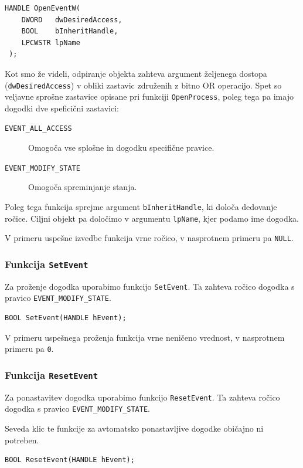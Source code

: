 \documentclass[a4paper,12pt,openright]{book}
\begin{document}
\begin{lstlisting}[style=func]
 HANDLE OpenEventW(
	DWORD   dwDesiredAccess,
	BOOL    bInheritHandle,
	LPCWSTR lpName
 );
\end{lstlisting}

Kot smo že videli, odpiranje objekta zahteva argument željenega dostopa (\texttt{dwDesiredAccess}) v obliki zastavic združenih z bitno OR operacijo.
Spet so veljavne sprošne zastavice opisane pri funkciji \texttt{OpenProcess}, poleg tega pa imajo dogodki dve speficični zastavici:
\begin{description}
	\item[\texttt{EVENT\_ALL\_ACCESS}] Omogoča vse splošne in dogodku specifične pravice.
	\item[\texttt{EVENT\_MODIFY\_STATE}] Omogoča spreminjanje stanja.
\end{description}

Poleg tega funkcija sprejme argument \texttt{bInheritHandle}, ki določa dedovanje ročice.
Ciljni objekt pa določimo v argumentu \texttt{lpName}, kjer podamo ime dogodka.

V primeru uspešne izvedbe funkcija vrne ročico, v nasprotnem primeru pa \texttt{NULL}.

\subsubsection{Funkcija \texttt{SetEvent}}

Za proženje dogodka uporabimo funkcijo \texttt{SetEvent}.
Ta zahteva ročico dogodka s pravico \texttt{EVENT\_MODIFY\_STATE}.

\begin{lstlisting}[style=func]
 BOOL SetEvent(HANDLE hEvent);
\end{lstlisting}

V primeru uspešnega proženja funkcija vrne neničeno vrednost, v nasprotnem primeru pa \texttt{0}.

\subsubsection{Funkcija \texttt{ResetEvent}}

Za ponastavitev dogodka uporabimo funkcijo \texttt{ResetEvent}.
Ta zahteva ročico dogodka s pravico \texttt{EVENT\_MODIFY\_STATE}.

Seveda klic te funkcije za avtomatsko ponastavljive dogodke običajno ni potreben.

\begin{lstlisting}[style=func]
 BOOL ResetEvent(HANDLE hEvent);
\end{lstlisting}
\end{document}
